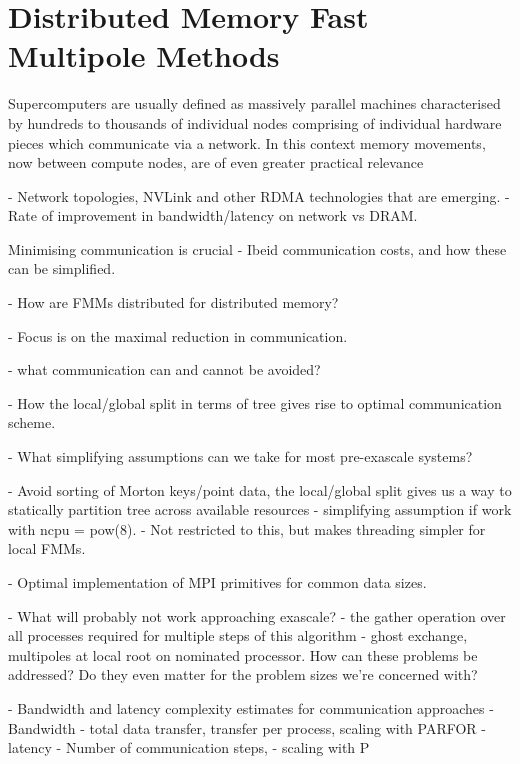 
\section{Distributed Memory Fast Multipole Methods}\label{chpt:fmm:sec:distributed}

Supercomputers are usually defined as massively parallel machines characterised by hundreds to thousands of individual nodes comprising of individual hardware pieces which communicate via a network. In this context memory movements, now between compute nodes, are of even greater practical relevance

- Network topologies, NVLink and other RDMA technologies that are emerging.
- Rate of improvement in bandwidth/latency on network vs DRAM.

Minimising communication is crucial
- Ibeid communication costs, and how these can be simplified.




- How are FMMs distributed for distributed memory?

- Focus is on the maximal reduction in communication.

- what communication can and cannot be avoided?

- How the local/global split in terms of tree gives rise to optimal communication scheme.

- What simplifying assumptions can we take for most pre-exascale systems?

- Avoid sorting of Morton keys/point data, the local/global split gives us a way to statically partition tree across available resources - simplifying assumption if work with ncpu = pow(8).
- Not restricted to this, but makes threading simpler for local FMMs.

- Optimal implementation of MPI primitives for common data sizes.

- What will probably not work approaching exascale?
- the gather operation over all processes required for multiple steps of this algorithm - ghost exchange, multipoles at local root on nominated processor. How can these problems be addressed? Do they even matter for the problem sizes we're concerned with?

- Bandwidth and latency complexity estimates for communication approaches
- Bandwidth
    - total data transfer, transfer per process, scaling with PARFOR
- latency
    - Number of communication steps,
    - scaling with P
